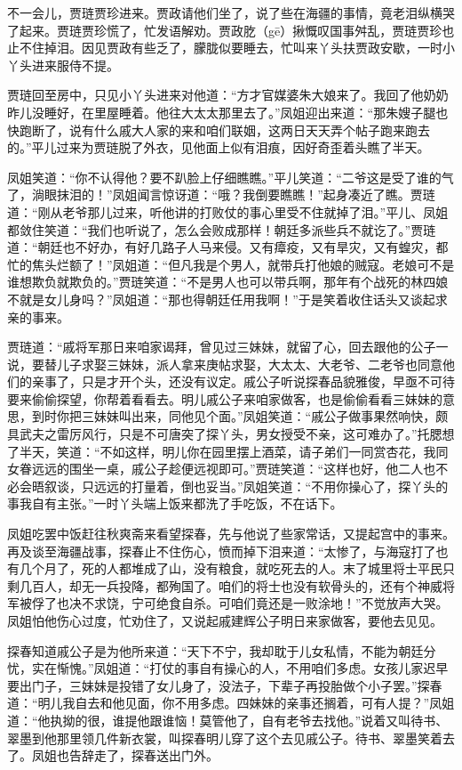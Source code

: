 \documentclass[12pt,oneside]{book}
\begin{document}
不一会儿，贾琏贾珍进来。贾政请他们坐了，说了些在海疆的事情，竟老泪纵横哭了起来。贾琏贾珍慌了，忙发语解劝。贾政肐（gē）揪慨叹国事舛乱，贾琏贾珍也止不住掉泪。因见贾政有些乏了，朦胧似要睡去，忙叫来丫头扶贾政安歇，一时小丫头进来服侍不提。

贾琏回至房中，只见小丫头进来对他道：“方才官媒婆朱大娘来了。我回了他奶奶昨儿没睡好，在里屋睡着。他往大太太那里去了。”凤姐迎出来道：“那朱嫂子腿也快跑断了，说有什么戚大人家的来和咱们联姻，这两日天天弄个帖子跑来跑去的。”平儿过来为贾琏脱了外衣，见他面上似有泪痕，因好奇歪着头瞧了半天。

凤姐笑道：“你不认得他？要不趴脸上仔细瞧瞧。”平儿笑道：“二爷这是受了谁的气了，淌眼抹泪的！”凤姐闻言惊讶道：“哦？我倒要瞧瞧！”起身凑近了瞧。贾琏道：“刚从老爷那儿过来，听他讲的打败仗的事心里受不住就掉了泪。”平儿、凤姐都敛住笑道：“我们也听说了，怎么会败成那样！朝廷多派些兵不就讫了。”贾琏道：“朝廷也不好办，有好几路子人马来侵。又有瘴疫，又有旱灾，又有蝗灾，都忙的焦头烂额了！”凤姐道：“但凡我是个男人，就带兵打他娘的贼寇。老娘可不是谁想欺负就欺负的。”贾琏笑道：“不是男人也可以带兵啊，那年有个战死的林四娘不就是女儿身吗？”凤姐道：“那也得朝廷任用我啊！”于是笑着收住话头又谈起求亲的事来。

贾琏道：“戚将军那日来咱家谒拜，曾见过三妹妹，就留了心，回去跟他的公子一说，要替儿子求娶三妹妹，派人拿来庚帖求娶，大太太、大老爷、二老爷也同意他们的亲事了，只是才开个头，还没有议定。戚公子听说探春品貌雅俊，早亟不可待要来偷偷探望，你帮着看看去。明儿戚公子来咱家做客，也是偷偷看看三妹妹的意思，到时你把三妹妹叫出来，同他见个面。”凤姐笑道：“戚公子做事果然响快，颇具武夫之雷厉风行，只是不可唐突了探丫头，男女授受不亲，这可难办了。”托腮想了半天，笑道：“不如这样，明儿你在园里摆上酒菜，请子弟们一同赏杏花，我同女眷远远的围坐一桌，戚公子趁便远视即可。”贾琏笑道：“这样也好，他二人也不必会晤叙谈，只远远的打量着，倒也妥当。”凤姐笑道：“不用你操心了，探丫头的事我自有主张。”一时丫头端上饭来都洗了手吃饭，不在话下。

凤姐吃罢中饭赶往秋爽斋来看望探春，先与他说了些家常话，又提起宫中的事来。再及谈至海疆战事，探春止不住伤心，愤而掉下泪来道：“太惨了，与海寇打了也有几个月了，死的人都堆成了山，没有粮食，就吃死去的人。末了城里将士平民只剩几百人，却无一兵投降，都殉国了。咱们的将士也没有软骨头的，还有个神威将军被俘了也决不求饶，宁可绝食自杀。可咱们竟还是一败涂地！”不觉放声大哭。凤姐怕他伤心过度，忙劝住了，又说起戚建辉公子明日来家做客，要他去见见。

探春知道戚公子是为他所来道：“天下不宁，我却耽于儿女私情，不能为朝廷分忧，实在惭愧。”凤姐道：“打仗的事自有操心的人，不用咱们多虑。女孩儿家迟早要出门子，三妹妹是投错了女儿身了，没法子，下辈子再投胎做个小子罢。”探春道：“明儿我自去和他见面，你不用多虑。四妹妹的亲事还搁着，可有人提？”凤姐道：“他执拗的很，谁提他跟谁恼！莫管他了，自有老爷去找他。”说着又叫待书、翠墨到他那里领几件新衣裳，叫探春明儿穿了这个去见戚公子。待书、翠墨笑着去了。凤姐也告辞走了，探春送出门外。
\end{document}
